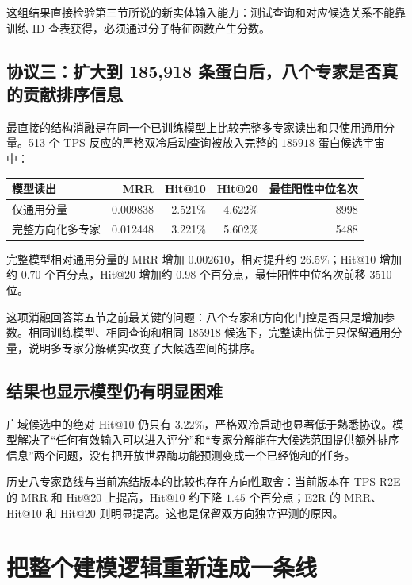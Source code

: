 \documentclass[UTF8,11pt,a4paper]{ctexart}
\begin{document}
这组结果直接检验第三节所说的新实体输入能力：测试查询和对应候选关系不能靠训练 ID 查表获得，必须通过分子特征函数产生分数。

\subsection{协议三：扩大到 185,918 条蛋白后，八个专家是否真的贡献排序信息}

最直接的结构消融是在同一个已训练模型上比较完整多专家读出和只使用通用分量。513 个 TPS 反应的严格双冷启动查询被放入完整的 $185918$ 蛋白候选宇宙中：

\begin{center}
\begin{tabular}{lrrrr}
\toprule
模型读出 & MRR & Hit@10 & Hit@20 & 最佳阳性中位名次 \\
\midrule
仅通用分量 & 0.009838 & 2.521\% & 4.622\% & 8998 \\
完整方向化多专家 & 0.012448 & 3.221\% & 5.602\% & 5488 \\
\bottomrule
\end{tabular}
\end{center}

完整模型相对通用分量的 MRR 增加 $0.002610$，相对提升约 $26.5\%$；Hit@10 增加约 $0.70$ 个百分点，Hit@20 增加约 $0.98$ 个百分点，最佳阳性中位名次前移 $3510$ 位。

这项消融回答第五节之前最关键的问题：八个专家和方向化门控是否只是增加参数。相同训练模型、相同查询和相同 $185918$ 候选下，完整读出优于只保留通用分量，说明多专家分解确实改变了大候选空间的排序。

\subsection{结果也显示模型仍有明显困难}

广域候选中的绝对 Hit@10 仍只有 $3.22\%$，严格双冷启动也显著低于熟悉协议。模型解决了“任何有效输入可以进入评分”和“专家分解能在大候选范围提供额外排序信息”两个问题，没有把开放世界酶功能预测变成一个已经饱和的任务。

历史八专家路线与当前冻结版本的比较也存在方向性取舍：当前版本在 TPS R2E 的 MRR 和 Hit@20 上提高，Hit@10 约下降 $1.45$ 个百分点；E2R 的 MRR、Hit@10 和 Hit@20 则明显提高。这也是保留双方向独立评测的原因。

\section{把整个建模逻辑重新连成一条线}
\end{document}
